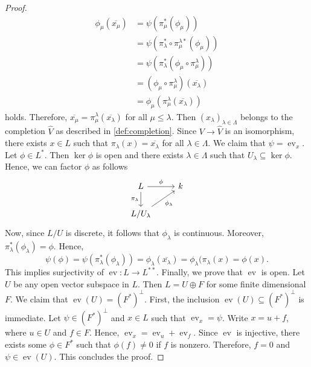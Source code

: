 \begin{proof}
	\begin{align*}
	\phi_{\mu}(\overline{x_{\mu}}) &= \psi(\pi_{\mu}^{*}(\phi_{\mu})) \\
	&= \psi(\pi_{\lambda}^{*} \circ \pi_{\mu}^{\lambda*}(\phi_{\mu})) \\
	&= \psi(\pi_{\lambda}^{*}(\phi_{\mu} \circ \pi_{\mu}^{\lambda})) \\
	&= (\phi_{\mu} \circ \pi_{\mu}^{\lambda})(\overline{x_{\lambda}}) \\
	&= \phi_{\mu}(\pi_{\mu}^{\lambda}(\overline{x_{\lambda}}))
	\end{align*}
	holds. Therefore, $\overline{x_\mu} = \pi_{\mu}^{\lambda}(\overline{x_{\lambda}})$ for all $\mu \leq \lambda$. Then $(x_{\lambda})_{\lambda\in \Lambda}$ belongs to the completion $\widehat{V}$ as described in \cref{def:completion}. Since $V \to \widehat{V}$ is an isomorphism, there exists $x\in L$ such that $\pi_{\lambda}(x) = \overline{x_{\lambda}}$ for all $\lambda\in \Lambda$. We claim that $\psi = \operatorname{ev}_{x}$. Let $\phi \in L^{*}$. Then $\ker\phi$ is open and there exists $\lambda\in \Lambda$ such that $U_{\lambda} \subseteq \ker\phi$. Hence, we can factor $\phi$ as follows
	\[
	\begin{tikzcd}
		L \arrow[r, "\phi"] \arrow[d, swap, "\pi_{\lambda}"] & k \\
		L/U_{\lambda} \arrow[ur, swap, "\phi_{\lambda}"] &
	\end{tikzcd}
	\]
	Now, since $L/U$ is discrete, it follows that $\phi_{\lambda}$ is continuous. Moreover, $\pi_{\lambda}^{*}(\phi_{\lambda}) = \phi$. Hence,
	\[
		\psi(\phi) = \psi(\pi_{\lambda}^{*}(\phi_{\lambda})) = \phi_{\lambda}(\overline{x_{\lambda}}) = \phi_{\lambda}(\pi_{\lambda}(x) = \phi(x).
	\]
	This implies surjectivity of $\operatorname{ev}\colon L \to L^{**}$. Finally, we prove that $\operatorname{ev}$ is open. Let $U$ be any open vector subspace in $L$. Then $L = U \oplus F$ for some finite dimensional $F$. We claim that $\operatorname{ev}(U) = (F^{*})^{\perp}$. First, the inclusion $\operatorname{ev}(U) \subseteq (F^{*})^{\perp}$ is immediate. Let $\psi \in (F^{*})^{\perp}$ and $x \in L$ such that $\operatorname{ev}_{x} = \psi$. Write $x = u + f$, where $u \in U$ and $f \in F$. Hence, $\operatorname{ev}_{x} = \operatorname{ev}_{u} + \operatorname{ev}_{f}$. Since $\operatorname{ev}$ is injective, there exists some $\phi\in F^{*}$ such that $\phi(f) \neq 0$ if $f$ is nonzero. Therefore, $f = 0$ and $\psi \in \operatorname{ev}(U)$. This concludes the proof.
\end{proof}

